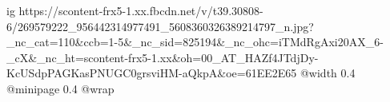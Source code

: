  
 
 
 
 

\ifcmt
  ig https://scontent-frx5-1.xx.fbcdn.net/v/t39.30808-6/269579222_956442314977491_5608360326389214797_n.jpg?_nc_cat=110&ccb=1-5&_nc_sid=825194&_nc_ohc=iTMdRgAxi20AX_6-_cX&_nc_ht=scontent-frx5-1.xx&oh=00_AT_HAZf4JTdjDy-KcUSdpPAGKasPNUGC0grsviHM-aQkpA&oe=61EE2E65
  @width 0.4
  @minipage 0.4
  @wrap \parpic[r]
\fi
